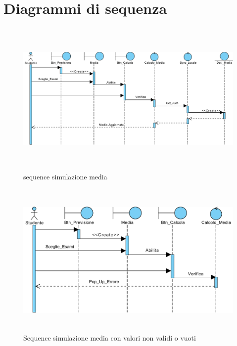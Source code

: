 \section{Diagrammi di sequenza}

\begin{figure}[H]
	\centering
	\includegraphics[height=3in]{imgs/gruppo3/sequence-media-valori-validi.pdf}
	\caption{sequence simulazione media}
	\label{fig:prova}
\end{figure}
\begin{figure}[H]
	\centering
	\includegraphics[height=3in]{imgs/gruppo3/sequence-media-valori-non-validi.pdf}
	\caption{Sequence simulazione media con valori non validi o vuoti}
	\label{fig:prova}
\end{figure}
